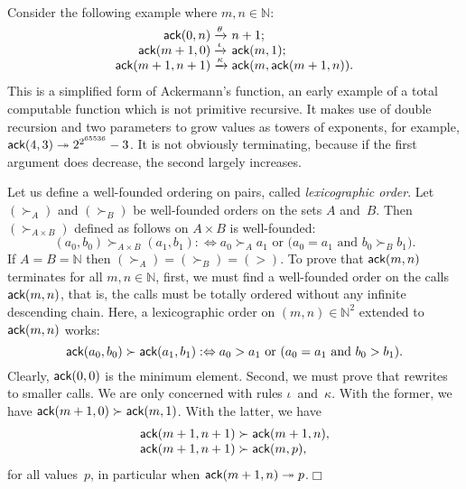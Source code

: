 Consider the following example where \(m,n \in \mathbb{N}\):
\begin{equation*}
\begin{array}{@{}r@{\;}l@{\;}l@{}}
\fun{ack}(0,n)     & \xrightarrow{\smash{\theta}} & n+1;\\
\fun{ack}(m+1,0)   & \xrightarrow{\smash{\iota}}  & \fun{ack}(m,1);\\
\fun{ack}(m+1,n+1) & \xrightarrow{\smash{\kappa}}
                   & \fun{ack}(m,\fun{ack}(m+1,n)).
\end{array}
\end{equation*}
This is a simplified form of Ackermann's
function, an early example of a total
computable function which is not primitive recursive. It makes use of
double recursion and two parameters to grow values as towers of
exponents, for example, \(\textsf{ack}(4,3) \twoheadrightarrow
2^{2^{65536}} - 3\). It is not obviously terminating, because if the
first argument does decrease, the second largely increases.

Let us define a well\hyp{}founded ordering on pairs, called
\emph{lexicographic order}. Let
\((\succ_A)\) and \((\succ_B)\) be well\hyp{}founded orders on the
sets \(A\) and~\(B\). Then \((\succ_{A \times B})\) defined as follows
on \(A \times B\) is well\hyp{}founded:
\begin{equation}
(a_0,b_0) \succ_{A \times B} (a_1,b_1) :\Leftrightarrow \text{\(a_0
    \succ_A a_1\) or (\(a_0 = a_1\) and \(b_0 \succ_B b_1\)).}
\label{def:lexico}
\end{equation}
If \(A=B=\mathbb{N}\) then \((\succ_A) = (\succ_B) = (>)\). To prove
that \(\textsf{ack}(m,n)\) terminates for all \(m,n \in \mathbb{N}\),
first, we must find a well\hyp{}founded order on the calls
\(\textsf{ack}(m,n)\), that is, the calls must be totally ordered without
any infinite descending chain. Here, a lexicographic order on \((m,n)
\in \mathbb{N}^2\) extended to \(\textsf{ack}(m,n)\) works:
\begin{equation*}
\textsf{ack}(a_0,b_0) \succ \textsf{ack}(a_1,b_1) :\Leftrightarrow
\text{\(a_0 > a_1\) or (\(a_0 = a_1\) and \(b_0 > b_1\)).}
\end{equation*}
Clearly, \(\textsf{ack}(0,0)\) is the minimum element. Second, we must
prove that  rewrites to smaller calls. We are only
concerned with rules \(\iota\)~and~\(\kappa\). With the former, we
have \(\textsf{ack}(m+1,0) \succ \textsf{ack}(m,1)\). With the latter, we
have
\begin{equation*}
  \begin{array}{@{}r@{\;}l@{\;}l@{}}
    \fun{ack}(m+1,n+1) & \succ & \fun{ack}(m+1,n),\\
    \fun{ack}(m+1,n+1) & \succ & \fun{ack}(m,p),
  \end{array}
\end{equation*}
for all values~\(p\), in particular when \(\textsf{ack}(m+1,n)
\twoheadrightarrow p\).\hfill\(\Box\)

